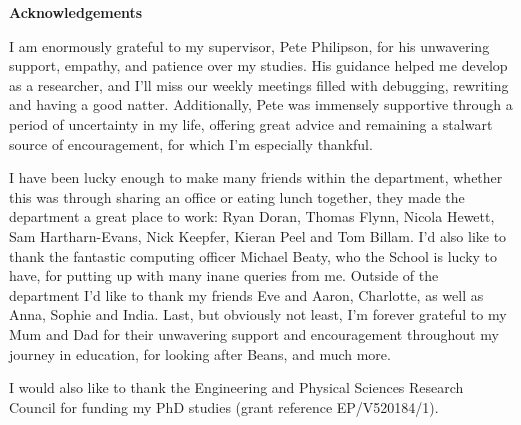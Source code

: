 \begin{center}
{\Huge \bf Acknowledgements}
\end{center}
\noindent
  I am enormously grateful to my supervisor, Pete Philipson, for his unwavering support, empathy, and patience over my studies. His guidance helped me develop as a researcher, and I'll miss our weekly meetings filled with debugging, rewriting and having a good natter. Additionally, Pete was immensely supportive through a period of uncertainty in my life, offering great advice and remaining a stalwart source of encouragement, for which I'm especially thankful.

  I have been lucky enough to make many friends within the department, whether this was through sharing an office or eating lunch together, they made the department a great place to work: Ryan Doran, Thomas Flynn, Nicola Hewett, Sam Hartharn-Evans, Nick Keepfer, Kieran Peel and Tom Billam. I'd also like to thank the fantastic computing officer Michael Beaty, who the School is lucky to have, for putting up with many inane queries from me.\newline
  Outside of the department I'd like to thank my friends Eve and Aaron, Charlotte, as well as Anna, Sophie and India. Last, but obviously not least, I'm forever grateful to my Mum and Dad for their unwavering support and encouragement throughout my journey in education, for looking after Beans, and much more.

  I would also like to thank the Engineering and Physical Sciences Research Council for funding my PhD studies (grant reference EP/V520184/1).
    
\thispagestyle{empty}
\restoregeometry